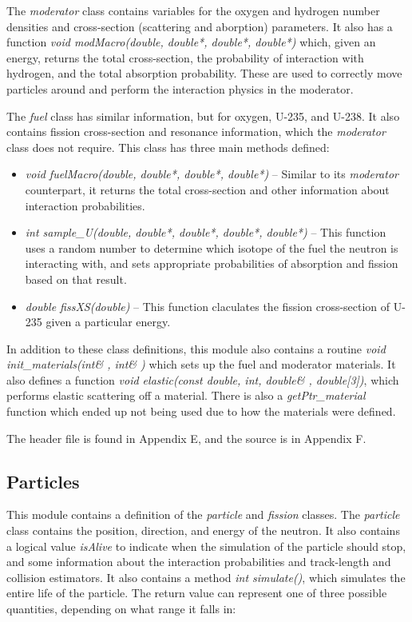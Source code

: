 The \textit{moderator} class contains variables for the oxygen and hydrogen number densities and cross-section (scattering and aborption) parameters.  It also has a function \textit{void modMacro(double, double*, double*, double*)} which, given an energy, returns the total cross-section, the probability of interaction with hydrogen, and the total absorption probability.  These are used to correctly move particles around and perform the interaction physics in the moderator.

The \textit{fuel} class has similar information, but for oxygen, U-235, and U-238.  It also contains fission cross-section and resonance information, which the \textit{moderator} class does not require.  This class has three main methods defined:

\begin{itemize}
\item \textit{void fuelMacro(double, double*, double*, double*)} -- Similar to its \textit{moderator} counterpart, it returns the total cross-section and other information about interaction probabilities.
\item \textit{int sample{\_}U(double, double*, double*, double*, double*)} -- This function uses a random number to determine which isotope of the fuel the neutron is interacting with, and sets appropriate probabilities of absorption and fission based on that result.
\item \textit{double fissXS(double)} -- This function claculates the fission cross-section of U-235 given a particular energy.
\end{itemize}

In addition to these class definitions, this module also contains a routine \textit{void init{\_}materials(int\& , int\& )} which sets up the fuel and moderator materials.  It also defines a function \textit{void elastic(const double, int, double\& , double[3])}, which performs elastic scattering off a material.  There is also a \textit{getPtr{\_}material} function which ended up not being used due to how the materials were defined.

The header file is found in Appendix E, and the source is in Appendix F.

\subsection{Particles}\label{ss:particles}

This module contains a definition of the \textit{particle} and \textit{fission} classes.  The \textit{particle} class contains the position, direction, and energy of the neutron.  It also contains a logical value \textit{isAlive} to indicate when the simulation of the particle should stop, and some information about the interaction probabilities and track-length and collision estimators.  It also contains a method \textit{int simulate()}, which simulates the entire life of the particle.  The return value can represent one of three possible quantities, depending on what range it falls in:

